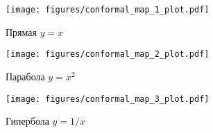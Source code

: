 \begin{frame}
	\begin{figure}
		\centering
		\texttt{[image: figures/conformal\_map\_1\_plot.pdf]}
		\caption{Прямая \(y=x\)}\label{fig:conformal_1}
	\end{figure}
\end{frame}

\begin{frame}
	\begin{figure}
		\centering
		\texttt{[image: figures/conformal\_map\_2\_plot.pdf]}
		\caption{Парабола \(y=x^2\)}\label{fig:conformal_2}
	\end{figure}
\end{frame}

\begin{frame}
	\begin{figure}
		\centering
		\texttt{[image: figures/conformal\_map\_3\_plot.pdf]}
		\caption{Гипербола \(y=1/x\)}\label{fig:conformal_3}
	\end{figure}
\end{frame}
